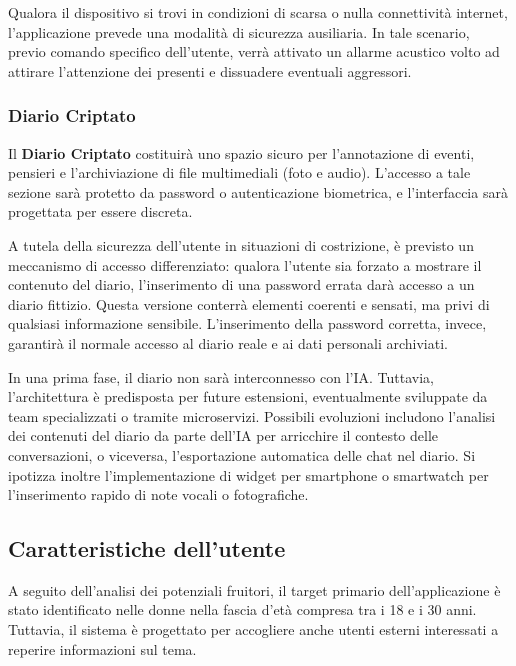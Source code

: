\documentclass[a4paper,12pt]{article}
\begin{document}
Qualora il dispositivo si trovi in condizioni di scarsa o nulla connettività internet, l'applicazione prevede una modalità di sicurezza ausiliaria. In tale scenario, previo comando specifico dell'utente, verrà attivato un allarme acustico volto ad attirare l'attenzione dei presenti e dissuadere eventuali aggressori.

\subsubsection{Diario Criptato}
Il \textbf{Diario Criptato} costituirà uno spazio sicuro per l'annotazione di eventi, pensieri e l'archiviazione di file multimediali (foto e audio). L'accesso a tale sezione sarà protetto da password o autenticazione biometrica, e l'interfaccia sarà progettata per essere discreta.

A tutela della sicurezza dell'utente in situazioni di costrizione, è previsto un meccanismo di accesso differenziato: qualora l'utente sia forzato a mostrare il contenuto del diario, l'inserimento di una password errata darà accesso a un diario fittizio. Questa versione conterrà elementi coerenti e sensati, ma privi di qualsiasi informazione sensibile. L'inserimento della password corretta, invece, garantirà il normale accesso al diario reale e ai dati personali archiviati.

In una prima fase, il diario non sarà interconnesso con l'IA.
Tuttavia, l'architettura è predisposta per future estensioni, eventualmente sviluppate da team specializzati o tramite microservizi. Possibili evoluzioni includono l'analisi dei contenuti del diario da parte dell'IA per arricchire il contesto delle conversazioni, o viceversa, l'esportazione automatica delle chat nel diario. Si ipotizza inoltre l'implementazione di widget per smartphone o smartwatch per l'inserimento rapido di note vocali o fotografiche.


\subsection{Caratteristiche dell'utente} \label{sec:caratteristiche_utente}
A seguito dell'analisi dei potenziali fruitori, il target primario dell'applicazione è stato identificato nelle donne nella fascia d'età compresa tra i 18 e i 30 anni. Tuttavia, il sistema è progettato per accogliere anche utenti esterni interessati a reperire informazioni sul tema.
\end{document}

